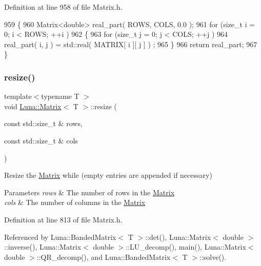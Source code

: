 Definition at line 958 of file Matrix.\+h.


\begin{DoxyCode}
959   \{
960     Matrix<double> real\_part( ROWS, COLS, 0.0 );
961     \textcolor{keywordflow}{for} (\textcolor{keywordtype}{size\_t} i = 0; i < ROWS; ++i )
962     \{
963       \textcolor{keywordflow}{for} (\textcolor{keywordtype}{size\_t} j = 0; j < COLS; ++j )
964       real\_part( i, j ) = std::real( MATRIX[ i ][ j ] ) ;
965     \}
966     \textcolor{keywordflow}{return} real\_part;
967   \}
\end{DoxyCode}
\mbox{\label{classLuna_1_1Matrix_a79c2f771fced9043429c72c155f8486c}} 
\subsubsection{\texorpdfstring{resize()}{resize()}}
{\footnotesize\ttfamily template$<$typename T $>$ \\
void \hyperlink{classLuna_1_1Matrix}{Luna\+::\+Matrix}$<$ T $>$\+::resize (\begin{DoxyParamCaption}\item[{const std\+::size\+\_\+t \&}]{rows,  }\item[{const std\+::size\+\_\+t \&}]{cols }\end{DoxyParamCaption})\hspace{0.3cm}{\ttfamily [inline]}}



Resize the \hyperlink{classLuna_1_1Matrix}{Matrix} while (empty entries are appended if necessary) 


\begin{DoxyParams}{Parameters}
{\em rows} & The number of rows in the \hyperlink{classLuna_1_1Matrix}{Matrix} \\
\hline
{\em cols} & The number of columns in the \hyperlink{classLuna_1_1Matrix}{Matrix} \\
\hline
\end{DoxyParams}


Definition at line 813 of file Matrix.\+h.



Referenced by Luna\+::\+Banded\+Matrix$<$ T $>$\+::det(), Luna\+::\+Matrix$<$ double $>$\+::inverse(), Luna\+::\+Matrix$<$ double $>$\+::\+L\+U\+\_\+decomp(), main(), Luna\+::\+Matrix$<$ double $>$\+::\+Q\+R\+\_\+decomp(), and Luna\+::\+Banded\+Matrix$<$ T $>$\+::solve().


